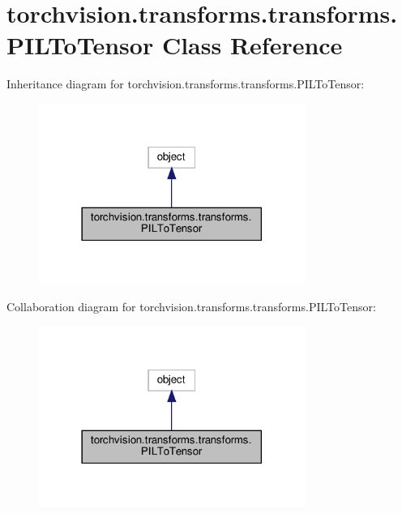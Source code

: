 \hypertarget{classtorchvision_1_1transforms_1_1transforms_1_1PILToTensor}{}\section{torchvision.\+transforms.\+transforms.\+P\+I\+L\+To\+Tensor Class Reference}
\label{classtorchvision_1_1transforms_1_1transforms_1_1PILToTensor}


Inheritance diagram for torchvision.\+transforms.\+transforms.\+P\+I\+L\+To\+Tensor\+:
\nopagebreak
\begin{figure}[H]
\begin{center}
\leavevmode
\includegraphics[width=246pt]{classtorchvision_1_1transforms_1_1transforms_1_1PILToTensor__inherit__graph}
\end{center}
\end{figure}


Collaboration diagram for torchvision.\+transforms.\+transforms.\+P\+I\+L\+To\+Tensor\+:
\nopagebreak
\begin{figure}[H]
\begin{center}
\leavevmode
\includegraphics[width=246pt]{classtorchvision_1_1transforms_1_1transforms_1_1PILToTensor__coll__graph}
\end{center}
\end{figure}
